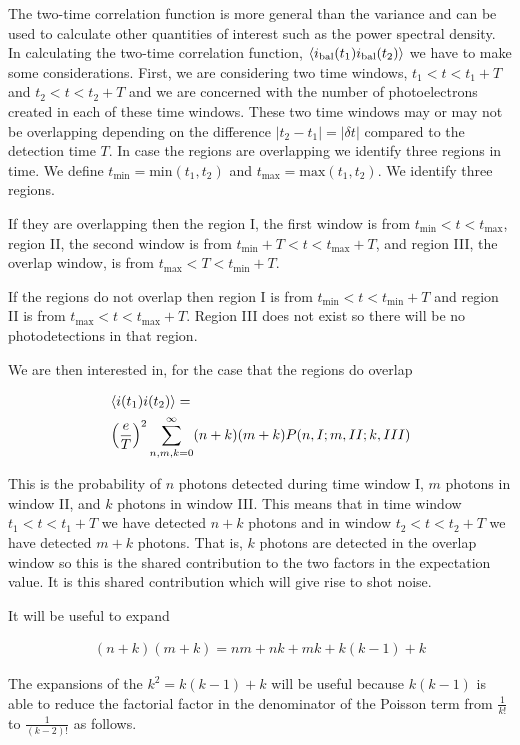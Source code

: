 \documentclass[12pt]{article}
\begin{document}
The two-time correlation function is more general than the variance and can be used to calculate other quantities of interest such as the power spectral density. In calculating the two-time correlation function, $\Braket{i_{\text{bal}}(t_1)i_{\text{bal}}(t_2)}$ we have to make some considerations. First, we are considering two time windows, $t_1<t<t_1+T$ and $t_2<t<t_2+T$ and we are concerned with the number of photoelectrons created in each of these time windows. These two time windows may or may not be overlapping depending on the difference $|t_2-t_1|=|\delta t|$ compared to the detection time $T$. In case the regions are overlapping we identify three regions in time. We define $t_{\text{min}} = \text{min}(t_1,t_2)$ and $t_{\text{max}} = \text{max}(t_1,t_2)$. We identify three regions. 

If they are overlapping then the region I, the first window is from $t_{\text{min}}<t<t_{\text{max}}$, region II, the second window is from $t_{\text{min}}+T<t<t_{\text{max}}+T$, and region III, the overlap window, is from $t_{\text{max}} < T < t_{\text{min}}+T$.

If the regions do not overlap then region I is from $t_{\text{min}}<t<t_{\text{min}}+T$ and region II is from $t_{\text{max}}<t<t_{\text{max}}+T$. Region III does not exist so there will be no photodetections in that region.

We are then interested in, for the case that the regions do overlap

\begin{align}
\label{twotime}
&\Braket{i(t_1)i(t_2)} =\\
&\left(\frac{e}{T}\right)^2 \sum_{n,m,k=0}^{\infty} (n+k)(m+k)P(n,I;m,II;k,III)
\end{align}

This is the probability of $n$ photons detected during time window I, $m$ photons in window II, and $k$ photons in window III. This means that in time window $t_1<t<t_1+T$ we have detected $n+k$ photons and in window $t_2<t<t_2+T$ we have detected $m+k$ photons. That is, $k$ photons are detected in the overlap window so this is the shared contribution to the two factors in the expectation value. It is this shared contribution which will give rise to shot noise.

It will be useful to expand

\begin{align}
(n+k)(m+k) = nm + nk + mk + k(k-1) + k
\end{align}

The expansions of the $k^2 = k(k-1) + k$ will be useful because $k(k-1)$ is able to reduce the factorial factor in the denominator of the Poisson term from $\frac{1}{k!}$ to $\frac{1}{(k-2)!}$ as follows.
\end{document}
